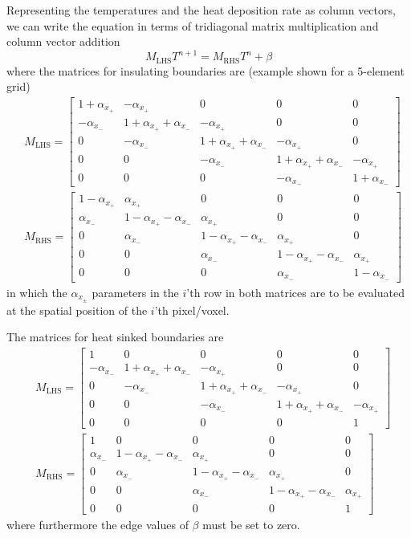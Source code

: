 \documentclass{scrartcl}
\begin{document}
Representing the temperatures and the heat deposition rate as column vectors, we can write the equation in terms of tridiagonal matrix multiplication and column vector addition
\begin{equation} \label{LHSRHS}
M_\mathrm{LHS} T^{n+1} = M_\mathrm{RHS} T^n + \beta
\end{equation}
where the matrices for insulating boundaries are (example shown for a 5-element grid)
\begin{align}
&M_\mathrm{LHS} = \begin{bmatrix}
1 + \alpha_{x_+} & -\alpha_{x_+} & 0 & 0 & 0\\
-\alpha_{x_-} & 1 + \alpha_{x_+} + \alpha_{x_-} & -\alpha_{x_+} & 0 & 0\\
0 & -\alpha_{x_-} & 1 + \alpha_{x_+} + \alpha_{x_-} & -\alpha_{x_+} & 0\\
0 & 0 & -\alpha_{x_-} & 1 + \alpha_{x_+} + \alpha_{x_-} & -\alpha_{x_+}\\
0 & 0 & 0 & -\alpha_{x_-} & 1 + \alpha_{x_-}
\end{bmatrix}\\
&M_\mathrm{RHS} = \begin{bmatrix}
1 - \alpha_{x_+} & \alpha_{x_+} & 0 & 0 & 0\\
\alpha_{x_-} & 1 - \alpha_{x_+} - \alpha_{x_-} & \alpha_{x_+} & 0 & 0\\
0 & \alpha_{x_-} & 1 - \alpha_{x_+} - \alpha_{x_-} & \alpha_{x_+} & 0\\
0 & 0 & \alpha_{x_-} & 1 - \alpha_{x_+} - \alpha_{x_-} & \alpha_{x_+}\\
0 & 0 & 0 & \alpha_{x_-} & 1 - \alpha_{x_-}
\end{bmatrix}
\end{align}
in which the $\alpha_{x_\pm}$ parameters in the $i$'th row in both matrices are to be evaluated at the spatial position of the $i$'th pixel/voxel.

The matrices for heat sinked boundaries are
\begin{align}
&M_\mathrm{LHS} = \begin{bmatrix}
1 & 0 & 0 & 0 & 0\\
-\alpha_{x_-} & 1 + \alpha_{x_+} + \alpha_{x_-} & -\alpha_{x_+} & 0 & 0\\
0 & -\alpha_{x_-} & 1 + \alpha_{x_+} + \alpha_{x_-} & -\alpha_{x_+} & 0\\
0 & 0 & -\alpha_{x_-} & 1 + \alpha_{x_+} + \alpha_{x_-} & -\alpha_{x_+}\\
0 & 0 & 0 & 0 & 1
\end{bmatrix}\\
&M_\mathrm{RHS} = \begin{bmatrix}
1 & 0 & 0 & 0 & 0\\
\alpha_{x_-} & 1 - \alpha_{x_+} - \alpha_{x_-} & \alpha_{x_+} & 0 & 0\\
0 & \alpha_{x_-} & 1 - \alpha_{x_+} - \alpha_{x_-} & \alpha_{x_+} & 0\\
0 & 0 & \alpha_{x_-} & 1 - \alpha_{x_+} - \alpha_{x_-} & \alpha_{x_+}\\
0 & 0 & 0 & 0 & 1
\end{bmatrix}
\end{align}
where furthermore the edge values of $\beta$ must be set to zero.
\end{document}
